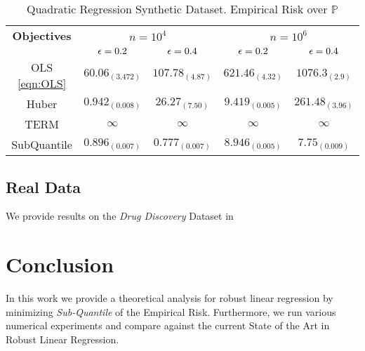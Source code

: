 \documentclass{article} %
\newcommand{\subhead}[1]{\multicolumn{1}{c}{#1}}%
\begin{document}
	\begin{table}[!h] \label{tab:quadratic-regression}
		\centering
		\caption{Quadratic Regression Synthetic Dataset. Empirical Risk over $\mathbb{P}$}
		\begin{tabular}{ccccc}
			\toprule 
			\textbf{Objectives}&                       \multicolumn{2}{c}{\textbf{$n = 10^4$}}&                    \multicolumn{2}{c}{\textbf{$n = 10^6$}}\\
			\cmidrule(rl){2-3} \cmidrule(rl){4-5} 
			& \subhead{${\epsilon} = 0.2$}& \subhead{${\epsilon} = 0.4$}& \subhead{${\epsilon} = 0.2$}& \subhead{${\epsilon} = 0.4$}\\ 
			\midrule
			OLS \ref{eqn:OLS}  &$60.06_{(3.472)}$& $107.78_{(4.87)}$& $621.46_{(4.32)}$& $1076.3_{(2.9)}$\\
			Huber \cite{Huber2009} &$0.942_{(0.008)}$& $26.27_{(7.50)}$&$9.419_{(0.005)}$&$261.48_{(3.96)}$\\
			TERM \cite{li2020tilted} &$\infty$&$\infty$&$\infty$&$\infty$\\
			SubQuantile &$\mathbf{0.896_{(0.007)}}$&$\mathbf{0.777_{(0.007)}}$&  $\mathbf{8.946_{(0.005)}}$& $\mathbf{7.75_{(0.009)}}$\\
			\bottomrule
		\end{tabular}
	\end{table}

	\subsection{Real Data}
	
	We provide results on the \textit{Drug Discovery} Dataset in \cite{DiakonikolasKKLSS19}
	
	\section{Conclusion}
	In this work we provide a theoretical analysis for robust linear regression by minimizing \textit{Sub-Quantile} of the Empirical Risk. Furthermore, we run various numerical experiments and compare against the current State of the Art in Robust Linear Regression.
	
	
\end{document}
